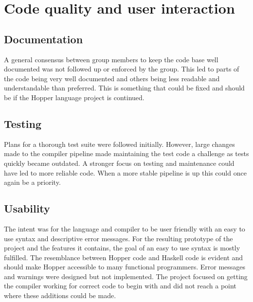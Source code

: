 \section{Code quality and user interaction}

\subsection{Documentation}

A general consensus between group members to keep the code base well documented was not followed up or enforced by the group. This led to parts of the code being very well documented and others being less readable and understandable than preferred. This is something that could be fixed and should be if the Hopper language project is continued.

\subsection{Testing}

Plans for a thorough test suite were followed initially. However, large changes made to the compiler pipeline made maintaining the test code a challenge as tests quickly became outdated. A stronger focus on testing and maintenance could have led to more reliable code. When a more stable pipeline is up this could once again be a priority.

\subsection{Usability}

The intent was for the language and compiler to be user friendly with an easy to use syntax and descriptive error messages.
For the resulting prototype of the project and the features it contains, the goal of an easy to use syntax is mostly fulfilled. The resemblance between Hopper code and Haskell code is evident and should make Hopper accessible to many functional programmers. %
Error messages and warnings were designed but not implemented. The project focused on getting the compiler working for correct code to begin with and did not reach a point where these additions could be made.



